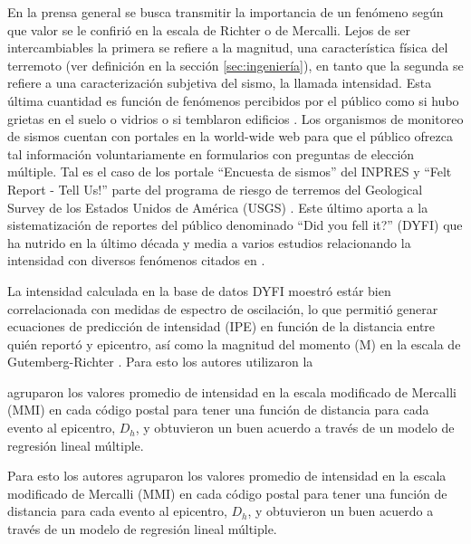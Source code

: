 \documentclass[a4paper]{report}
\begin{document}
En la prensa general se busca transmitir la importancia de un fenómeno según que valor se le confirió en la escala de Richter o de Mercalli.
Lejos de ser intercambiables la primera se refiere a la magnitud, una característica física del terremoto (ver definición en la sección \ref{sec:ingeniería}), en tanto que la segunda se refiere a una caracterización subjetiva del sismo, la llamada intensidad.
Esta última cuantidad es función de fenómenos percibidos por el público como si hubo grietas en el suelo o vidrios o si temblaron edificios \cite[sección 4.2.3]{fowler_solid_1990}.
Los organismos de monitoreo de sismos cuentan con portales en la world-wide web para que el público ofrezca tal información voluntariamente en formularios con preguntas de elección múltiple.
Tal es el caso de los portale ``Encuesta de sismos'' del INPRES \cite{noauthor_encuesta_nodate} y ``Felt Report - Tell Us!'' \cite{noauthor_felt_nodate} parte del programa de riesgo de terremos del Geological Survey de los Estados Unidos de América (USGS) \cite{david_jay_usgs_2012}. 
Este último aporta a la sistematización de reportes del público denominado ``Did you fell it?'' (DYFI) que ha nutrido en la último década y media a varios estudios relacionando la intensidad con diversos fenómenos citados en \cite{noauthor_dyfi_nodate}.

La intensidad calculada en la base de datos DYFI moestró estár bien correlacionada con medidas de espectro de oscilación, lo que permitió generar ecuaciones de predicción de intensidad (IPE) en función de la distancia entre quién reportó y epicentro, así como la magnitud del momento (M) en la escala de Gutemberg-Richter \cite{atkinson_did_2007}.
Para esto los autores utilizaron la 


agruparon los valores promedio de intensidad en la escala modificado de Mercalli (MMI) en cada código postal para tener una función de distancia para cada evento al epicentro, \(D_h\), y obtuvieron un buen acuerdo a través de un modelo de regresión lineal múltiple.

\cite{atkinson_did_2007}



Para esto los autores agruparon los valores promedio de intensidad en la escala modificado de Mercalli (MMI) en cada código postal para tener una función de distancia para cada evento al epicentro, \(D_h\), y obtuvieron un buen acuerdo a través de un modelo de regresión lineal múltiple.
\end{document}
